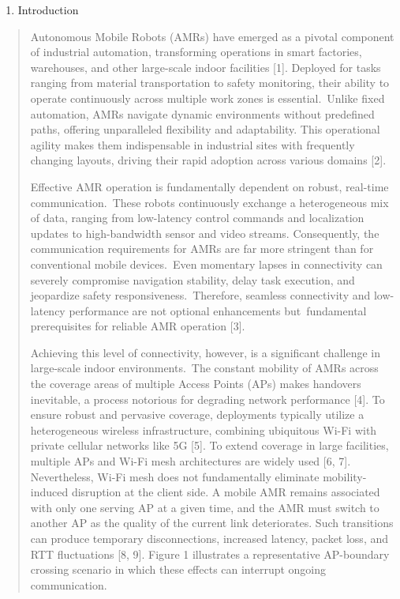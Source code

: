 \begin{enumerate}
\def\labelenumi{\arabic{enumi}.}
\item
  Introduction
\end{enumerate}

\begin{quote}
Autonomous Mobile Robots (AMRs) have emerged as a pivotal component of industrial automation, transforming operations in smart factories, warehouses, and other large-scale indoor facilities {[}1{]}. Deployed for tasks ranging from material transportation to safety monitoring, their ability to operate continuously across multiple work zones is essential.~Unlike fixed automation, AMRs navigate dynamic environments without predefined paths, offering unparalleled flexibility and adaptability. This operational agility makes them indispensable in industrial sites with frequently changing layouts, driving their rapid adoption across various domains {[}2{]}.

Effective AMR operation is fundamentally dependent on robust, real-time communication.~These robots continuously exchange a heterogeneous mix of data, ranging from low-latency control commands and localization updates to high-bandwidth sensor and video streams. Consequently, the communication requirements for AMRs are far more stringent than for conventional mobile devices.~Even momentary lapses in connectivity can severely compromise navigation stability, delay task execution, and jeopardize safety responsiveness.~Therefore, seamless connectivity and low-latency performance are not optional enhancements but~fundamental prerequisites for reliable AMR operation {[}3{]}.

Achieving this level of connectivity, however, is a significant challenge in large-scale indoor environments.~The constant mobility of AMRs across the coverage areas of multiple Access Points (APs) makes handovers inevitable, a process notorious for degrading network performance {[}4{]}. To ensure robust and pervasive coverage, deployments typically utilize a heterogeneous wireless infrastructure, combining ubiquitous Wi-Fi with private cellular networks like 5G {[}5{]}. To extend coverage in large facilities, multiple APs and Wi-Fi mesh architectures are widely used {[}6, 7{]}. Nevertheless, Wi-Fi mesh does not fundamentally eliminate mobility-induced disruption at the client side. A mobile AMR remains associated with only one serving AP at a given time, and the AMR must switch to another AP as the quality of the current link deteriorates. Such transitions can produce temporary disconnections, increased latency, packet loss, and RTT fluctuations {[}8, 9{]}. Figure 1 illustrates a representative AP-boundary crossing scenario in which these effects can interrupt ongoing communication.


\end{quote}
